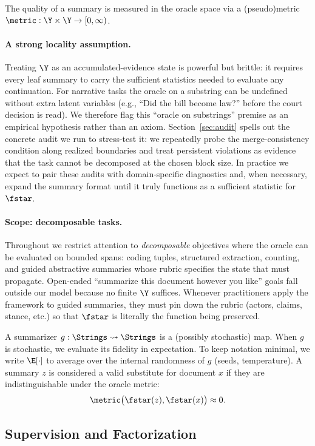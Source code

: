 The quality of a summary is measured in the oracle space via a (pseudo)metric $\metric: \Y \times \Y \to [0, \infty)$.

\paragraph{A strong locality assumption.}
Treating $\Y$ as an accumulated-evidence state is powerful but brittle: it requires every leaf summary to carry the sufficient statistics needed to evaluate any continuation. For narrative tasks the oracle on a substring can be undefined without extra latent variables (e.g., ``Did the bill become law?'' before the court decision is read). We therefore flag this ``oracle on substrings'' premise as an empirical hypothesis rather than an axiom. Section~\ref{sec:audit} spells out the concrete audit we run to stress-test it: we repeatedly probe the merge-consistency condition along realized boundaries and treat persistent violations as evidence that the task cannot be decomposed at the chosen block size. In practice we expect to pair these audits with domain-specific diagnostics and, when necessary, expand the summary format until it truly functions as a sufficient statistic for $\fstar$.

\paragraph{Scope: decomposable tasks.}
Throughout we restrict attention to \emph{decomposable} objectives where the oracle can be evaluated on bounded spans: coding tuples, structured extraction, counting, and guided abstractive summaries whose rubric specifies the state that must propagate. Open-ended ``summarize this document however you like'' goals fall outside our model because no finite $\Y$ suffices. Whenever practitioners apply the framework to guided summaries, they must pin down the rubric (actors, claims, stance, etc.) so that $\fstar$ is literally the function being preserved.

A summarizer $g: \Strings \rightsquigarrow \Strings$ is a (possibly stochastic) map. When $g$ is stochastic, we evaluate its fidelity in expectation. To keep notation minimal, we write $\E[\cdot]$ to average over the internal randomness of $g$ (seeds, temperature). A summary $z$ is considered a valid substitute for document $x$ if they are indistinguishable under the oracle metric:
\[
\metric\big(\fstar(z), \fstar(x)\big) \approx 0.
\]

\subsection{Supervision and Factorization}


